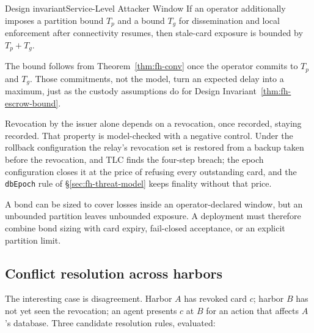 \documentclass[11pt,a4paper]{article}
\theoremstyle{definition}
\theoremstyle{remark}
\begin{document}
\begin{pdclaim}{Design invariant}{Service-Level Attacker Window}
\setlength{\parskip}{4pt plus 1pt}
\label{cor:fh-window}
If an operator additionally imposes a partition bound $T_p$ and a bound $T_g$ for dissemination and local enforcement after connectivity resumes, then stale-card exposure is bounded by $T_p+T_g$.

The bound follows from Theorem~\ref{thm:fh-conv} once the operator commits to $T_p$ and $T_g$. Those commitments, not the model, turn an expected delay into a maximum, just as the custody assumptions do for Design Invariant~\ref{thm:fh-escrow-bound}.
\end{pdclaim}



Revocation by the issuer alone depends on a revocation, once recorded, staying
recorded. That property is model-checked with a negative control. Under the
rollback configuration the relay's revocation set is restored from a backup taken
before the revocation, and TLC finds the four-step breach; the epoch
configuration closes it at the price of refusing every outstanding card, and
the \texttt{dbEpoch} rule of \S\ref{sec:fh-threat-model} keeps finality
without that price.



A bond can be sized to cover losses inside an operator-declared window, but an unbounded partition leaves unbounded exposure. A deployment must therefore combine bond sizing with card expiry, fail-closed acceptance, or an explicit partition limit.

\subsection{Conflict resolution across harbors}\label{sec:fh-revocation-conflict}

The interesting case is disagreement. Harbor $A$ has revoked card $c$; harbor $B$ has not yet seen the revocation; an agent presents $c$ at $B$ for an action that affects $A$'s database. Three candidate resolution rules, evaluated:
\end{document}

